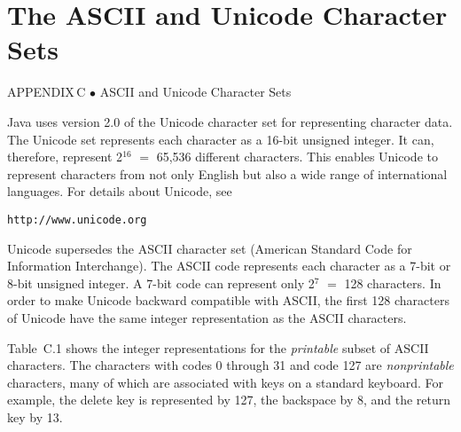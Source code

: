 \setcounter{table}{0}
\setcounter{figure}{0}
\renewcommand{\thetable}{\mbox{C.\arabic{table}}}%
\renewcommand{\thefigure}{\mbox{C--\arabic{figure}}}%

\chapter{The ASCII and Unicode Character Sets}

{{\color{cyan}APPENDIX\,C\,\,$\bullet$\,\,}ASCII and Unicode Character Sets}

\noindent Java uses version 2.0 of the Unicode character set for
representing character data.  The Unicode set represents each character
as a 16-bit unsigned integer.  It can, therefore, represent 2$^{16}$ $=$
65,536 different characters.  This enables Unicode to represent
characters from not only English but also a wide range of international
languages.  For details about Unicode, see

\begin{jjjlisting}
\begin{lstlisting}[commentstyle=\color{black}]
http://www.unicode.org
\end{lstlisting}
\end{jjjlisting}

\vspace{-3pt}Unicode supersedes the ASCII character set (American Standard Code for
Information Interchange).  The ASCII code represents each character as
a 7-bit or 8-bit unsigned integer.   A 7-bit code can represent only
2$^7$ $=$ 128 characters.   In order to make Unicode backward compatible
with ASCII, the first 128 characters of Unicode have the same
integer representation as the ASCII characters.

Table~C.1 shows the integer representations for the
{\it printable} subset of ASCII characters.  The characters with codes
0 through 31 and code 127 are {\it nonprintable} characters, many of
which are associated with keys on a standard keyboard.  For example,
the delete key is represented by 127, the backspace by 8, and the
return key by 13.



